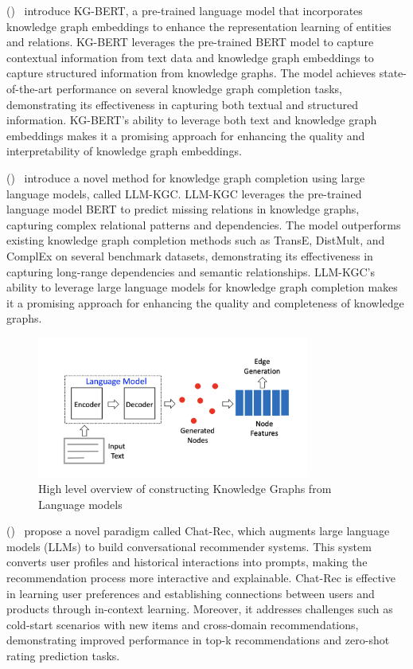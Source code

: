 \documentclass[11pt,a4paper,openany,oneside,titlepage]{article}
\newcommand{\citewithnumber}[1]{%
  \citeauthor{#1} (\citeyear{#1})~\cite{#1}%
}
\begin{document}
\citewithnumber {zhang2021kgbert} introduce KG-BERT, a pre-trained language model that incorporates knowledge graph embeddings to enhance the representation learning of entities and relations. KG-BERT leverages the pre-trained BERT model to capture contextual information from text data and knowledge graph embeddings to capture structured information from knowledge graphs. The model achieves state-of-the-art performance on several knowledge graph completion tasks, demonstrating its effectiveness in capturing both textual and structured information. KG-BERT's ability to leverage both text and knowledge graph embeddings makes it a promising approach for enhancing the quality and interpretability of knowledge graph embeddings.

\citewithnumber {ullah2021llm-kgc} introduce a novel method for knowledge graph completion using large language models, called LLM-KGC. LLM-KGC leverages the pre-trained language model BERT to predict missing relations in knowledge graphs, capturing complex relational patterns and dependencies. The model outperforms existing knowledge graph completion methods such as TransE, DistMult, and ComplEx on several benchmark datasets, demonstrating its effectiveness in capturing long-range dependencies and semantic relationships. LLM-KGC's ability to leverage large language models for knowledge graph completion makes it a promising approach for enhancing the quality and completeness of knowledge graphs.

\begin{figure}[H]
  \centering
  \includegraphics[width=0.8\textwidth]{img/Idea.png}
  \caption{High level overview of constructing Knowledge Graphs from Language models}
  \label{fig:kg_construction}
  \end{figure}
  
\citewithnumber {gao2023chatrec} propose a novel paradigm called Chat-Rec, which augments large language models (LLMs) to build conversational recommender systems. This system converts user profiles and historical interactions into prompts, making the recommendation process more interactive and explainable. Chat-Rec is effective in learning user preferences and establishing connections between users and products through in-context learning. Moreover, it addresses challenges such as cold-start scenarios with new items and cross-domain recommendations, demonstrating improved performance in top-k recommendations and zero-shot rating prediction tasks.
\end{document}
